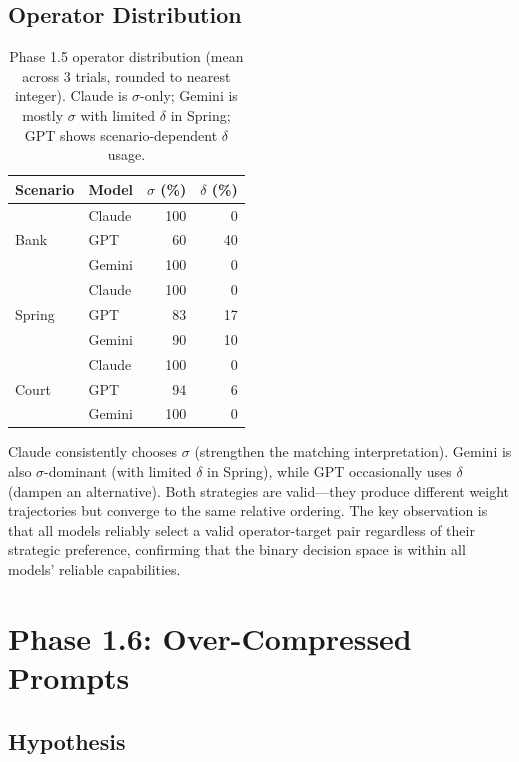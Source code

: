 \documentclass[11pt,a4paper]{article}
\begin{document}
\subsection{Operator Distribution}

\begin{table}[ht]
\centering
\begin{tabular}{llrr}
\toprule
\textbf{Scenario} & \textbf{Model} & \textbf{$\sigma$ (\%)} & \textbf{$\delta$ (\%)} \\
\midrule
\multirow{3}{*}{Bank} & Claude & 100 & 0 \\
 & GPT & 60 & 40 \\
 & Gemini & 100 & 0 \\
\midrule
\multirow{3}{*}{Spring} & Claude & 100 & 0 \\
 & GPT & 83 & 17 \\
 & Gemini & 90 & 10 \\
\midrule
\multirow{3}{*}{Court} & Claude & 100 & 0 \\
 & GPT & 94 & 6 \\
 & Gemini & 100 & 0 \\
\bottomrule
\end{tabular}
\caption{Phase 1.5 operator distribution (mean across 3 trials, rounded to nearest integer).
Claude is $\sigma$-only; Gemini is mostly $\sigma$ with limited $\delta$ in Spring;
GPT shows scenario-dependent $\delta$ usage.}
\label{tab:phase1_5_ops}
\end{table}

Claude consistently chooses $\sigma$ (strengthen the matching
interpretation). Gemini is also $\sigma$-dominant (with limited $\delta$ in Spring),
while GPT occasionally uses $\delta$ (dampen an alternative).
Both strategies are valid---they produce different weight trajectories but
converge to the same relative ordering. The key observation is that all models
reliably select a valid operator-target pair regardless of their strategic
preference, confirming that the binary decision space is within all models'
reliable capabilities.

\section{Phase 1.6: Over-Compressed Prompts}
\label{sec:phase1_6}

\subsection{Hypothesis}
\end{document}
